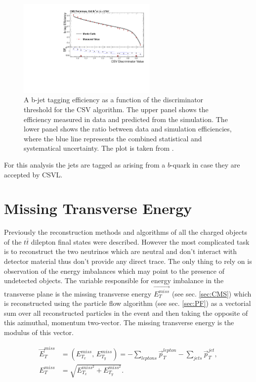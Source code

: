 \begin{figure}[t]
  \centering
  \includegraphics[width=0.6\textwidth]{04_event_reconstruction/plots/Figure_012-b.pdf}
  \caption{A b-jet tagging efficiency as a function of the discriminator threshold for the CSV algorithm. The upper panel shows the efficiency measured in data and predicted from the simulation.
  The lower panel shows the ratio between data and simulation efficiencies, where the blue line represents the combined statistical and systematical uncertainty. The plot is taken from \cite{CMS-PAS-BTV-13-001}.}
  \label{fig:CSVeff}
\end{figure}

For this analysis the jets are tagged as arising from a $b$-quark in case they are accepted by CSVL.

\section{Missing Transverse Energy}

Previously the reconstruction methods and algorithms of all the charged objects of the $t\bar{t}$ dilepton final states were described. However the most complicated 
task is to reconstruct the two neutrinos which are neutral and don't interact with detector material thus don't provide any direct trace. The only thing to rely on is
observation of the energy imbalances which may point to the presence of undetected objects. The variable responsible for energy imbalance in the transverse plane is 
the missing transverse energy $\vec{E^{miss}_{T}}$ (see sec. \ref{sec:CMS}) which is reconstructed using the particle flow algorithm \cite{CMS-PAS-PFT-09-001} (see sec. \ref{sec:PF})
as a vectorial sum over all reconstructed particles in the event and then taking the opposite of this azimuthal, momentum two-vector. The missing transverse energy is the modulus
of this vector.

\begin{align}
 \vec{E}_{T}^{miss} & = (E_{T_{x}}^{miss}, \, E_{T_{y}}^{miss}) = - \sum_{leptons} \vec{p}_{T}^{lepton} - \sum_{jets} \vec{p}_{T}^{jet}, \\
 E_{T}^{miss} & = \sqrt{E_{T_{x}}^{miss^{2}} + E_{T_{y}}^{miss^{2}}}.
\end{align}

